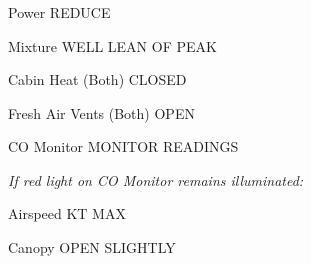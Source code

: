 \begin{multicols}{2}
\subsubsection*{}
\begin{enumerate*}
\item Power \dotfill REDUCE
\item Mixture \dotfill WELL LEAN OF PEAK
\item Cabin Heat (Both) \dotfill CLOSED
\item Fresh Air Vents (Both) \dotfill OPEN
\item CO Monitor \dotfill MONITOR READINGS
\item \emph{If red light on CO Monitor remains illuminated:}

  \begin{itemize*}
    \item Airspeed  KT MAX
    \item Canopy \dotfill OPEN SLIGHTLY
    \end{itemize*}
\end{enumerate*}
\end{multicols}


\normalsize
\cleardoublepage
\ohead{\leftmark} %
\chead{} %

